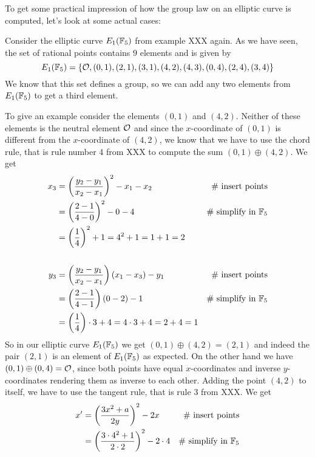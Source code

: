 To get some practical impression of how the group law on an elliptic curve is computed, let's look at some actual cases: 
\begin{example}Consider the elliptic curve $E_1(\mathbb{F}_5)$ from example XXX again.  As we have seen, the set of rational points contains $9$ elements and is given by
$$
E_1(\mathbb{F}_5) = \{\mathcal{O}, (0,1),(2,1),(3,1),(4,2),(4,3),(0,4),(2,4),(3,4)\}
$$
We know that this set defines a group, so we can add any two elements from $E_1(\mathbb{F}_5)$ to get a third element. 

To give an example consider the elements $(0,1)$ and $(4,2)$. Neither of these elements is the neutral element $\mathcal{O}$ and since the $x$-coordinate of $(0,1)$ is different from the $x$-coordinate of $(4,2)$, we know that we have to use the chord rule, that is rule number 4 from XXX to compute the sum $(0,1)\oplus (4,2)$. We get
\begin{align*}
x_3  & = \left(\frac{y_2-y_1}{x_2-x_1}\right)^2 -x_1-x_2 & \text{\# insert points}\\
     & = \left(\frac{2-1}{4-0}\right)^2 -0-4  & \text{\# simplify in } \mathbb{F}_5\\
     & = \left(\frac{1}{4}\right)^2 +1
       = 4^2 +1
       = 1 +1 
       = 2
\\
\\
y_3  & = \left(\frac{y_2-y_1}{x_2-x_1} \right)\left(x_1-x_3\right) - y_1  & \text{\# insert points}\\     
     & = \left(\frac{2-1}{4-1} \right)\left(0-2\right) - 1   & \text{\# simplify in } \mathbb{F}_5\\    
     & = \left(\frac{1}{4} \right)\cdot 3 + 4   
       = 4\cdot 3 + 4
       = 2 + 4
       = 1          
\end{align*} 
So in our elliptic curve $E_1(\mathbb{F}_5)$ we get $(0,1)\oplus (4,2) =(2,1)$ and indeed the pair $(2,1)$ is an element of $E_1(\mathbb{F}_5)$ as expected. On the other hand we have $(0,1)\oplus (0,4) =\mathcal{O}$, since both points have equal $x$-coordinates and inverse $y$-coordinates rendering them as inverse to each other. Adding the point $(4,2)$ to itself, we have to use the tangent rule, that is rule 3 from XXX. We get 
\begin{align*}
x'  & = \left(\frac{3x^2+a}{2y}\right)^2 -2x   & \text{\# insert points}\\
    & = \left(\frac{3\cdot 4^2+1}{2\cdot 2}\right)^2 -2\cdot 4 & \text{\# simplify in } \F_5 \\

\end{align*}
\end{example}

